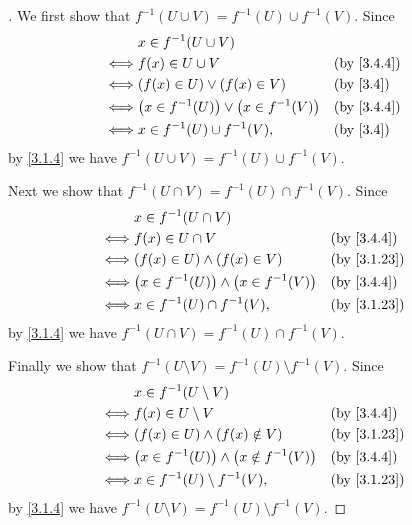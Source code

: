 \begin{proof}[]
  We first show that \(f^{-1}(U \cup V) = f^{-1}(U) \cup f^{-1}(V)\).
  Since
  \begin{align*}
         & x \in f^{-1}(U \cup V)                                         \\
    \iff & f(x) \in U \cup V                              &  & \by{3.4.4} \\
    \iff & (f(x) \in U) \lor (f(x) \in V)                 &  & \by{3.4}   \\
    \iff & \pa{x \in f^{-1}(U)} \lor \pa{x \in f^{-1}(V)} &  & \by{3.4.4} \\
    \iff & x \in f^{-1}(U) \cup f^{-1}(V),                &  & \by{3.4}
  \end{align*}
  by \cref{3.1.4} we have \(f^{-1}(U \cup V) = f^{-1}(U) \cup f^{-1}(V)\).

  Next we show that \(f^{-1}(U \cap V) = f^{-1}(U) \cap f^{-1}(V)\).
  Since
  \begin{align*}
         & x \in f^{-1}(U \cap V)                                           \\
    \iff & f(x) \in U \cap V                               &  & \by{3.4.4}  \\
    \iff & (f(x) \in U) \land (f(x) \in V)                 &  & \by{3.1.23} \\
    \iff & \pa{x \in f^{-1}(U)} \land \pa{x \in f^{-1}(V)} &  & \by{3.4.4}  \\
    \iff & x \in f^{-1}(U) \cap f^{-1}(V),                 &  & \by{3.1.23}
  \end{align*}
  by \cref{3.1.4} we have \(f^{-1}(U \cap V) = f^{-1}(U) \cap f^{-1}(V)\).

  Finally we show that \(f^{-1}(U \setminus V) = f^{-1}(U) \setminus f^{-1}(V)\).
  Since
  \begin{align*}
         & x \in f^{-1}(U \setminus V)                                         \\
    \iff & f(x) \in U \setminus V                             &  & \by{3.4.4}  \\
    \iff & (f(x) \in U) \land (f(x) \notin V)                 &  & \by{3.1.23} \\
    \iff & \pa{x \in f^{-1}(U)} \land \pa{x \notin f^{-1}(V)} &  & \by{3.4.4}  \\
    \iff & x \in f^{-1}(U) \setminus f^{-1}(V),               &  & \by{3.1.23}
  \end{align*}
  by \cref{3.1.4} we have \(f^{-1}(U \setminus V) = f^{-1}(U) \setminus f^{-1}(V)\).
\end{proof}

